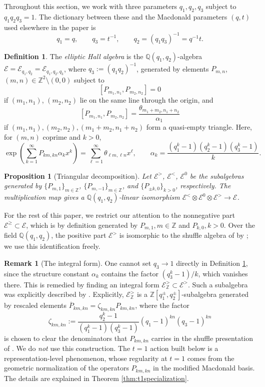 \documentclass{amsart}
\numberwithin{equation}{section}
\newtheorem{proposition}[lemma]{Proposition}%
\theoremstyle{definition}
\newtheorem{remark}[lemma]{Remark}%
\newtheorem{definition}[lemma]{Definition}%
\def\bar{\overline}
\newcommand{\cE}{\mathcal{E}}
\newcommand{\Z}{{\mathbb Z}}
\newcommand{\Q}{{\mathbb Q}}
\begin{document}
Throughout this section, we work with three parameters $q_1, q_2, q_3$ subject to $q_1 q_2 q_3 = 1$. The dictionary between these and the Macdonald parameters $(q,t)$ used elsewhere in the paper is
\begin{equation}\label{eq:dictionary}
q_1 = q, \qquad q_3 = t^{-1}, \qquad q_2 = (q_1 q_3)^{-1} = q^{-1} t.
\end{equation}

\begin{definition}\label{def:eha}
The {\em elliptic Hall algebra} is the $\Q(q_1, q_2)$-algebra $\cE = \cE_{q_1, q_2}=\cE_{q_1,q_2,q_3}$, where $q_3 := (q_1 q_2)^{-1}$, generated by elements $P_{m,n}$, $(m,n) \in \Z^2 \setminus (0,0)$ subject to
$$[P_{m_1,n_1}, P_{m_2,n_2}] = 0$$ if $(m_1,n_1)$, $(m_2,n_2)$ lie on the same line through the origin, and 
$$[P_{m_1,n_1}, P_{m_2,n_2}] = \frac{\theta_{m_1+m_2, n_1+n_2}}{\alpha_1}$$ if $(m_1,n_1), (m_2,n_2), (m_1+m_2, n_1+n_2)$ form a quasi-empty triangle. Here, for $(m,n)$ coprime and $k>0$,
$$\exp\left(\sum_{k=1}^\infty P_{km, kn} \alpha_k x^k\right) = \sum_{\ell=1}^\infty \theta_{\ell m, \ell n} x^\ell, \qquad \alpha_k = \frac{(q_1^k - 1)(q_2^k - 1)(q_3^k - 1)}{k}.$$
\end{definition}

\begin{proposition}[Triangular decomposition]
Let $\cE^>$, $\cE^<$, $\cE^0$ be the subalgebras generated by $\{P_{m,1}\}_{m \in \Z}$, $\{P_{m,-1}\}_{m \in \Z}$, and $\{P_{\pm k, 0}\}_{k > 0}$, respectively. The multiplication map gives a $\Q(q_1, q_2)$-linear isomorphism $\cE^< \otimes \cE^0 \otimes \cE^> \to \cE$.
\end{proposition}

For the rest of this paper, we restrict our attention to the nonnegative part $\cE^\geq \subset \cE$, which is by definition generated by $P_{m,1}, m\in \Z$ and $P_{k,0}, k > 0$. 
Over the field $\Q(q_1,q_2)$, the positive part $\cE^>$ is isomorphic to the shuffle algebra of \cite{FHHSY} by \cite{NegutShuffle}; we use this identification freely.

\begin{remark}[The integral form]\label{rmk:integralform}
One cannot set $q_3\to 1$ directly in Definition \ref{def:eha}, since the structure constant $\alpha_k$ contains the factor $(q_3^k-1)/k$, which vanishes there. This is remedied by finding an integral form $\cE^>_\Z\subset\cE^>$. Such a subalgebra was explicitly described by \cite{NegutIF}. Explicitly, $\cE^>_\Z$ is a $\Z[q_1^\pm,q_2^\pm]$-subalgebra generated by rescaled elements $\bar P_{km,kn}=\zeta_{km,kn}P_{km,kn}$, where the factor $$\zeta_{km,kn}:=\frac{q_2^k-1}{(q_1^k-1)(q_3^k-1)}(q_1-1)^{kn}(q_3-1)^{kn}$$ is chosen to clear the denominators that $P_{km,kn}$ carries in the shuffle presentation of \cite[(45)]{NegutIF}. We do {\em not} use this construction. The $t=1$ action built below is a representation-level phenomenon, whose regularity at $t=1$ comes from the geometric normalization of the operators $P_{km,kn}$ in the modified Macdonald basis. The details are explained in Theorem \ref{thm:t1specialization}.
\end{remark}
\end{document}
